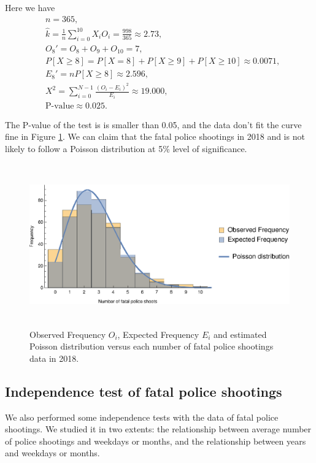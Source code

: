 \documentclass[conf]{new-aiaa}
\begin{document}
Here we have
\begin{align*}
&n=365,\\
&\hat{k} = \frac{1}{n}\sum_{i=0}^{10} X_iO_i = \frac{998}{365} \approx 2.73,\\
&O_8'=O_8+O_9+O_{10}=7,\\
&P[X\geqslant8]=P[X=8]+P[X\geqslant9]+P[X\geqslant10]\approx 0.0071,\\
&E_8'=nP[X\geqslant8]\approx2.596,\\
&X^2=\sum_{i=0}^{N-1}\frac{(O_i-E_i)^2}{E_i}\approx19.000,\\
&\text{P-value}\approx0.025.
\end{align*}

The P-value of the test is is smaller than 0.05, and the data don't fit the curve fine in Figure \ref{fig:q3-2018-exp}. We can claim that the fatal police shootings in 2018 and is not likely to follow a Poisson distribution at 5\% level of significance.

\begin{figure}[!htbp]
\centering
\includegraphics[height=7cm]{q3/q3-2018-exp.eps}
\caption{Observed Frequency $O_i$, Expected Frequency $E_i$ and estimated Poisson distribution versus each number of fatal police shootings data in 2018.}
\label{fig:q3-2018-exp}
\end{figure}

\newpage

\subsection{Independence test of fatal police shootings}

We also performed some independence tests with the data of fatal police shootings. We studied it in two extents: the relationship between average number of police shootings and weekdays or months, and the relationship between years and weekdays or months.
\end{document}
